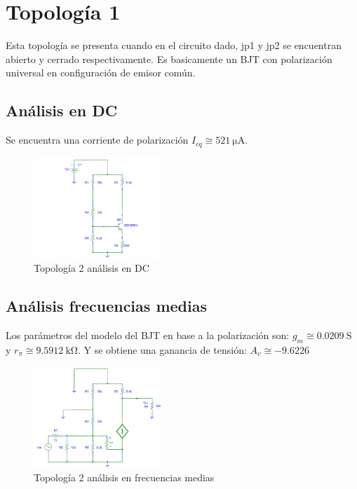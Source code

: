 \documentclass[letterpaper, 10 pt, conference]{ieeeconf}  %
\begin{document}
\section{Topología 1}
Esta topología se presenta cuando en el circuito dado, jp1 y jp2 se encuentran abierto y cerrado respectivamente. Es basicamente un BJT con polarización universal en configuración de emisor común.
\subsection{Análisis en DC}
Se encuentra una corriente de polarización $I_{cq} \cong \qty{521}{\micro\ampere}$.

\begin{figure}[H]
 \centering
 \includegraphics[width=0.43\textwidth]{./Imagenes/topologia1_dc.png}
 \caption{Topología 2 análisis en DC}
\end{figure}

\subsection{Análisis frecuencias medias}
Los parámetros del modelo del BJT en base a la polarización son: $g_m \cong \qty{0.0209}{\siemens}$ y $r_{\pi} \cong \qty{9.5912}{\kilo\ohm}$. Y se obtiene una ganancia de tensión: $A_v \cong -9.6226$

\begin{figure}[H]
 \centering
 \includegraphics[width=0.43\textwidth]{./Imagenes/topologia1_fm.png}
 \caption{Topología 2 análisis en frecuencias medias}
\end{figure}
\end{document}
